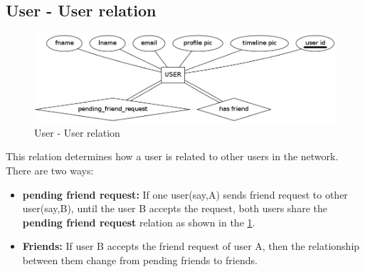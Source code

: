 \documentclass{article}
\begin{document}
\subsection{User - User relation}
\begin{figure}[h]
\centering
\includegraphics[scale=0.4]{user_friend.png}
\caption{User - User relation}
\label{fig1}
\end{figure}
This relation determines how a user is related to other users in the network. There are two ways:
\begin{itemize}
\item \textbf{pending friend request:} If one user(say,A) sends friend request to other user(say,B), until the user B accepts the request, both users share the \textbf{pending friend request} relation as shown in the \ref{fig1}.
\item \textbf{Friends:} If user B accepts the friend request of user A, then the relationship between them change from pending friends to friends. 
\end{itemize}
\end{document}
